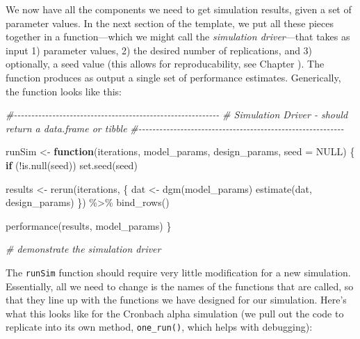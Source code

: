 \documentclass[
]{book}
\newenvironment{Shaded}{\begin{snugshade}}{\end{snugshade}}
\newcommand{\AttributeTok}[1]{\textcolor[rgb]{0.77,0.63,0.00}{#1}}
\newcommand{\CommentTok}[1]{\textcolor[rgb]{0.56,0.35,0.01}{\textit{#1}}}
\newcommand{\ConstantTok}[1]{\textcolor[rgb]{0.00,0.00,0.00}{#1}}
\newcommand{\ControlFlowTok}[1]{\textcolor[rgb]{0.13,0.29,0.53}{\textbf{#1}}}
\newcommand{\FunctionTok}[1]{\textcolor[rgb]{0.00,0.00,0.00}{#1}}
\newcommand{\NormalTok}[1]{#1}
\newcommand{\OtherTok}[1]{\textcolor[rgb]{0.56,0.35,0.01}{#1}}
\newcommand{\SpecialCharTok}[1]{\textcolor[rgb]{0.00,0.00,0.00}{#1}}
\begin{document}
We now have all the components we need to get simulation results, given a set of parameter values.
In the next section of the template, we put all these pieces together in a function---which we might call the \emph{simulation driver}---that takes as input 1) parameter values, 2) the desired number of replications, and 3) optionally, a seed value (this allows for reproducability, see Chapter \citet{sec_reproducability}). The function produces as output a single set of performance estimates. Generically, the function looks like this:

\begin{Shaded}
\begin{Highlighting}[]
\CommentTok{\#{-}{-}{-}{-}{-}{-}{-}{-}{-}{-}{-}{-}{-}{-}{-}{-}{-}{-}{-}{-}{-}{-}{-}{-}{-}{-}{-}{-}{-}{-}{-}{-}{-}{-}{-}{-}{-}{-}{-}{-}{-}{-}{-}{-}{-}{-}{-}{-}{-}{-}{-}{-}{-}{-}{-}{-}{-}{-}{-}}
\CommentTok{\# Simulation Driver {-} should return a data.frame or tibble}
\CommentTok{\#{-}{-}{-}{-}{-}{-}{-}{-}{-}{-}{-}{-}{-}{-}{-}{-}{-}{-}{-}{-}{-}{-}{-}{-}{-}{-}{-}{-}{-}{-}{-}{-}{-}{-}{-}{-}{-}{-}{-}{-}{-}{-}{-}{-}{-}{-}{-}{-}{-}{-}{-}{-}{-}{-}{-}{-}{-}{-}{-}}

\NormalTok{runSim }\OtherTok{\textless{}{-}} \ControlFlowTok{function}\NormalTok{(iterations, model\_params, design\_params, }\AttributeTok{seed =} \ConstantTok{NULL}\NormalTok{) \{}
  \ControlFlowTok{if}\NormalTok{ (}\SpecialCharTok{!}\FunctionTok{is.null}\NormalTok{(seed)) }\FunctionTok{set.seed}\NormalTok{(seed)}

\NormalTok{  results }\OtherTok{\textless{}{-}} \FunctionTok{rerun}\NormalTok{(iterations, \{}
\NormalTok{                dat }\OtherTok{\textless{}{-}} \FunctionTok{dgm}\NormalTok{(model\_params)}
                \FunctionTok{estimate}\NormalTok{(dat, design\_params)}
\NormalTok{              \}) }\SpecialCharTok{\%\textgreater{}\%}
    \FunctionTok{bind\_rows}\NormalTok{()}
  

  \FunctionTok{performance}\NormalTok{(results, model\_params)}
\NormalTok{\}}

\CommentTok{\# demonstrate the simulation driver}
\end{Highlighting}
\end{Shaded}

The \texttt{runSim} function should require very little modification for a new simulation. Essentially, all we need to change is the names of the functions that are called, so that they line up with the functions we have designed for our simulation. Here's what this looks like for the Cronbach alpha simulation (we pull out the code to replicate into its own method, \texttt{one\_run()}, which helps with debugging):
\end{document}
